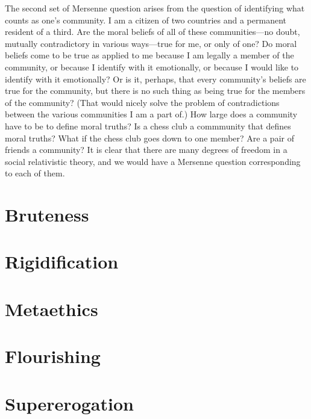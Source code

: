 The second set of Mersenne question arises from the question of identifying what counts as one's community. I am a citizen of two countries
and a permanent resident of a third. Are the moral beliefs of all of these communities---no doubt, mutually contradictory in various ways---true
for me, or only of one? Do moral beliefs come to be true as applied to me because I am legally a member of the community, or because I identify
with it emotionally, or because I would like to identify with it emotionally? Or is it, perhaps, that every community's beliefs are true
for the community, but there is no such thing as being true for the members of the community? (That would nicely solve the problem of
contradictions between the various communities I am a part of.) How large does a community have to be to define moral truths? Is a chess
club a commmunity that defines moral truths? What if the chess club goes down to one member? Are a pair of friends a community? It is clear
that there are many degrees of freedom in a social relativistic theory, and we would have a Mersenne question corresponding to each of them.

\section{Bruteness}
\section{Rigidification}

\section{Metaethics}
\section{Flourishing}
\section{Supererogation}
\chaptertail 
